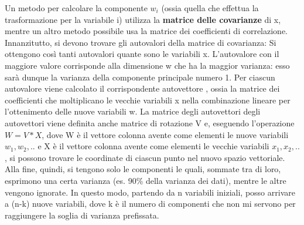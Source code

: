 Un metodo per calcolare la componente $w_i$ (ossia quella che effettua la trasformazione per la variabile i) utilizza la \textbf{matrice delle covarianze} di x, mentre un altro metodo possibile usa la matrice dei coefficienti di correlazione. Innanzitutto, si devono trovare gli autovalori della matrice di covarianza: Si ottengono così tanti autovalori quante sono le variabili x. L'autovalore con il maggiore valore corrisponde alla dimensione w che ha la maggior varianza: esso sarà dunque la varianza della componente principale numero 1. Per ciascun autovalore viene calcolato il corrispondente autovettore , ossia la matrice dei coefficienti che moltiplicano le vecchie variabili x nella combinazione lineare per l'ottenimento delle nuove variabili w. La matrice degli autovettori degli autovettori viene definita anche matrice di rotazione V e, eseguendo l'operazione $W = V*X $, dove W è il vettore colonna avente come elementi le nuove variabili $w_1,w_2,..$ e X è il vettore colonna avente come elementi le vecchie variabili $x_1,x_2,..$, si possono trovare le coordinate di ciascun punto nel nuovo spazio vettoriale. Alla fine, quindi, si tengono solo le componenti le quali, sommate tra di loro, esprimono una certa varianza (es. 90\% della varianza dei dati), mentre le altre vengono ignorate. In questo modo, partendo da n variabili iniziali, posso arrivare a (n-k) nuove variabili, dove k è il numero di componenti che non mi servono per raggiungere la soglia di varianza prefissata.
